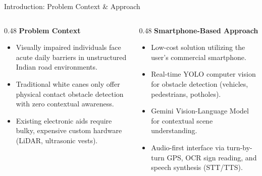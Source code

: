 \begin{frame}{Introduction: Problem Context \& Approach}
\begin{columns}[T]
  \begin{column}{0.48\textwidth}
    {\large\textbf{\textcolor{MyUnivGreen}{Problem Context}}}\\[6pt]
    \begin{itemize}
      \item Visually impaired individuals face acute daily barriers in unstructured Indian road environments.
      \item Traditional white canes only offer physical contact obstacle detection with zero contextual awareness.
      \item Existing electronic aids require bulky, expensive custom hardware (LiDAR, ultrasonic vests).
    \end{itemize}
  \end{column}
  
  \begin{column}{0.48\textwidth}
    {\large\textbf{\textcolor{MyUnivGreen}{Smartphone-Based Approach}}}\\[6pt]
    \begin{itemize}
      \item Low-cost solution utilizing the user's commercial smartphone.
      \item Real-time YOLO computer vision for obstacle detection (vehicles, pedestrians, potholes).
      \item Gemini Vision-Language Model for contextual scene understanding.
      \item Audio-first interface via turn-by-turn GPS, OCR sign reading, and speech synthesis (STT/TTS).
    \end{itemize}
  \end{column}
\end{columns}
\end{frame}

